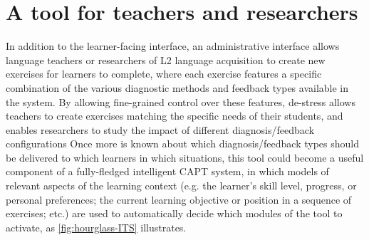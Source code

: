 \documentclass[a4paper]{article}
\newcommand{\TODO}[1]{{\color{red}\textbf{[TODO #1]}}}
\begin{document}
\section{A tool for teachers and researchers}
In addition to the learner-facing interface, 
an administrative interface allows
language teachers or researchers of L2 language acquisition 
to
create new exercises for learners to complete, where each exercise features a specific combination of the various diagnostic methods and feedback types available in the system. By allowing fine-grained control over these features, de-stress allows teachers to create exercises matching the specific needs of their students, and enables researchers to study the 
impact of
different diagnosis/feedback configurations
%
%
%
%
Once more is known about which diagnosis/feedback types should be delivered to which learners in which situations, this tool could become a useful component of a fully-fledged intelligent CAPT system, in which 
models of relevant aspects of the learning context (e.g. the learner's skill level, progress, or personal preferences; the current learning objective or position in a sequence of exercises; etc.)
are used to automatically decide which modules of the tool to activate, as \cref{fig:hourglass-ITS} illustrates.
\end{document}
